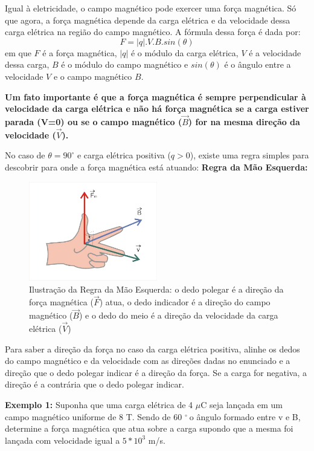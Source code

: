 \documentclass[12pt]{extarticle}
\newcommand{\grad}{$^{\circ}\:$}
\newcommand{\<}{\langle}
\renewcommand{\>}{\rangle}
\theoremstyle{definition}
\begin{document}
Igual à eletricidade, o campo magnético pode exercer uma força magnética. Só que agora, a força magnética depende da carga elétrica e da velocidade dessa carga elétrica na região do campo magnético. A fórmula dessa força é dada por:
\begin{equation}
    F = |q|.V.B.sin(\theta)
\end{equation}
em que $F$ é a força magnética, $|q|$ é o módulo da carga elétrica, $V$ é a velocidade dessa carga, $B$ é o módulo do campo magnético e $sin(\theta)$ é o ângulo entre a velocidade $V$ e o campo magnético $B$.

\textbf{Um fato importante é que a força magnética é sempre perpendicular à velocidade da carga elétrica e não há força magnética se a carga estiver parada (V=0) ou se o campo magnético ($\vec{B}$) for na mesma direção da velocidade ($\vec{V}$).}

No caso de $\theta = 90^{\circ}$ e carga elétrica positiva ($q>0$), existe uma regra simples para descobrir para onde a força magnética está atuando: \textbf{Regra da Mão Esquerda:}

\begin{figure}[h]
    \centering
    \includegraphics[width=0.5\textwidth]{regra_da_mao_esquerda.png}
    \caption{Ilustração da Regra da Mão Esquerda: o dedo polegar é a direção da força magnética ($\vec{F}$) atua, o dedo indicador é a direção do campo magnético ($\vec{B}$) e o dedo do meio é a direção da velocidade da carga elétrica ($\vec{V}$) }
    \label{fig:regra_mao_esq}
\end{figure}

Para saber a direção da força no caso da carga elétrica positiva, alinhe os dedos do campo magnético e da velocidade com as direções dadas no enunciado e a direção que o dedo polegar indicar é a direção da força. Se a carga for negativa, a direção é a contrária que o dedo polegar indicar.



\textbf{Exemplo 1:} Suponha que uma carga elétrica de 4 $\mu$C seja lançada em um campo magnético uniforme de 8 T. Sendo de 60 \grad o ângulo formado entre v e B, determine a força magnética que atua sobre a carga supondo que a mesma foi lançada com velocidade igual a $5*10^3$ m/s.
\end{document}
